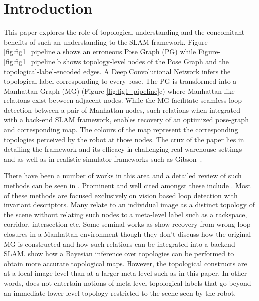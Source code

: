 \documentclass[letterpaper, 10 pt, conference]{ieeeconf}  %
\begin{document}
	\section{Introduction}
	
	This paper explores the role of topological understanding and the concomitant benefits of such an understanding to the SLAM framework. Figure-\ref{fig:fig1_pipeline}a shows an erroneous Pose Graph (PG) while Figure-\ref{fig:fig1_pipeline}b shows topology-level nodes of the Pose Graph and the topological-label-encoded edges. A Deep Convolutional Network infers the topological label corresponding to every pose. The PG is transformed into a Manhattan Graph (MG) (Figure-\ref{fig:fig1_pipeline}c) where Manhattan-like relations exist between adjacent nodes. While the MG facilitate seamless loop detection between a pair of Manhattan nodes, such relations when integrated with a back-end SLAM framework, enables recovery of an optimized pose-graph and corresponding map. The colours of the map represent the corresponding topologies perceived by the robot at those nodes. The crux of the paper lies in detailing the framework and its efficacy in challenging real warehouse settings and as well as in realistic simulator frameworks such as Gibson~\cite{xiazamirhe2018gibsonenv}.
	
	There have been a number of works in this area and a detailed review of such methods can be seen in \cite{garcia2015vision}. Prominent and well cited amongst these include \cite{ulrich2000appearance, sunderhauf2012switchable, pronobis2006discriminative, ranganathan2006rao,kosecka2003qualitative }. Most of these methods are focused exclusively on vision based loop detection with invariant descriptors. Many relate to an individual image as a distinct topology of the scene without relating such nodes to a meta-level label such as a rackspace, corridor, intersection etc. Some seminal works as \cite{agarwal2013robust} show recovery from wrong loop closures in a Manhattan environment though they don't discuss how the original MG is constructed and how such relations can be integrated into a backend SLAM. \cite{ranganathan2006bayesian} show how a Bayesian inference over topologies can be performed to obtain more accurate topological maps. However, the topological constructs are at a local image level than at a larger meta-level such as in this paper. In other words, \cite{ranganathan2006bayesian} does not entertain  notions of meta-level topological labels that go beyond an immediate lower-level topology restricted to the scene seen by the robot.
	
\end{document}
